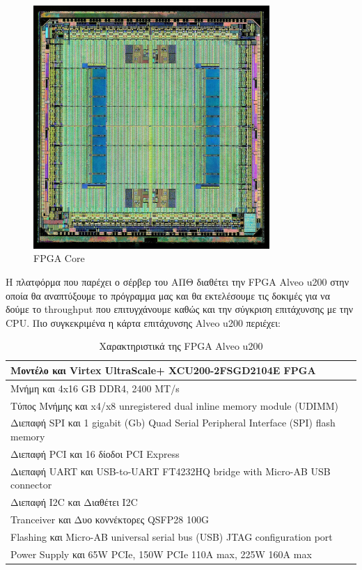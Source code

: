 \begin{figure}[h!]
  \centering
  \includegraphics[width=0.8\textwidth]{figures/chapter3/fpga_core.png}
  \caption{FPGA Core}
  \label{fig:fpga_core}
\end{figure}

Η πλατφόρμα που παρέχει ο σέρβερ του ΑΠΘ διαθέτει την FPGA Alveo u200 στην οποία θα αναπτύξουμε το πρόγραμμα μας και θα εκτελέσουμε τις δοκιμές για να 
δούμε το throughput που επιτυγχάνουμε καθώς και την σύγκριση επιτάχυνσης με την CPU. Πιο συγκεκριμένα η κάρτα επιτάχυνσης Alveo u200 περιέχει:

\begin{table}[h!]
  \centering
  \begin{tabular}{|l|l|}
    \hline
    Μοντέλο και Virtex UltraScale+ XCU200-2FSGD2104E FPGA \\
    \hline
    Μνήμη και 4x16 GB DDR4, 2400 MT/s \\
    \hline
    Τύπος Μνήμης και x4/x8 unregistered dual inline memory module (UDIMM) \\
    \hline
    Διεπαφή SPI και 1 gigabit (Gb) Quad Serial Peripheral Interface (SPI) flash memory \\
    \hline
    Διεπαφή PCI και 16 δίοδοι PCI Express \\
    \hline
    Διεπαφή UART και USB-to-UART FT4232HQ bridge with Micro-AB USB connector \\
    \hline
    Διεπαφή I2C και Διαθέτει I2C \\
    \hline
    Tranceiver και Δυο κοννέκτορες QSFP28 100G \\
    \hline
    Flashing και Micro-AB universal serial bus (USB) JTAG configuration port \\
    \hline
    Power Supply και 65W PCIe, 150W PCIe 110A max, 225W 160A max \\
    \hline
  \end{tabular}
  \caption{Χαρακτηριστικά της FPGA Alveo u200}
  \label{tab:alveo_u200_specs}
\end{table}

